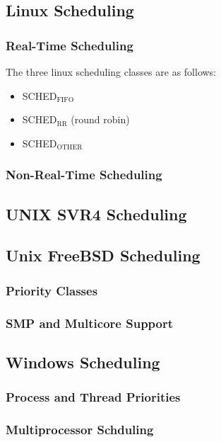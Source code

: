 \documentclass[11pt]{article}
\begin{document}
\subsection{Linux Scheduling}
\label{sec:orgheadline122}

\subsubsection{Real-Time Scheduling}
\label{sec:orgheadline120}


The three linux scheduling classes are as follows:

\begin{itemize}
\item SCHED\(_{\text{FIFO}}\)
\item SCHED\(_{\text{RR}}\) (round robin)
\item SCHED\(_{\text{OTHER}}\)
\end{itemize}

\subsubsection{Non-Real-Time Scheduling}
\label{sec:orgheadline121}

\subsection{UNIX SVR4 Scheduling}
\label{sec:orgheadline123}

\subsection{Unix FreeBSD Scheduling}
\label{sec:orgheadline126}

\subsubsection{Priority Classes}
\label{sec:orgheadline124}



\subsubsection{SMP and Multicore Support}
\label{sec:orgheadline125}

\subsection{Windows Scheduling}
\label{sec:orgheadline129}

\subsubsection{Process and Thread Priorities}
\label{sec:orgheadline127}

\subsubsection{Multiprocessor Schduling}
\label{sec:orgheadline128}
\end{document}

